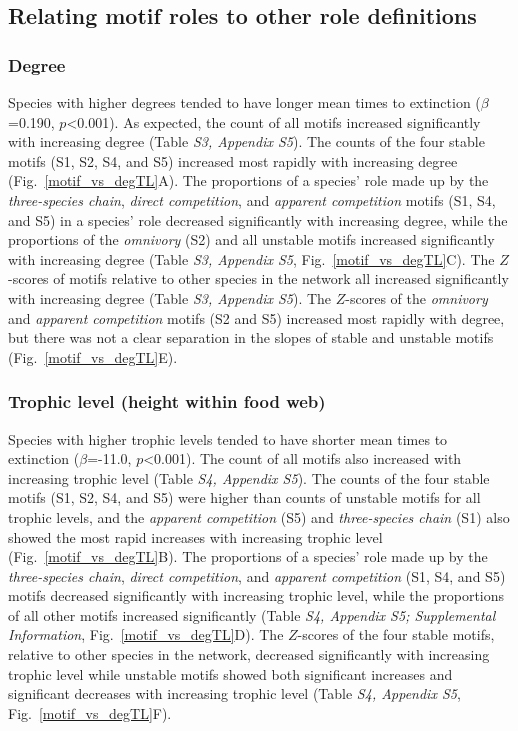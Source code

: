 \documentclass[12pt]{article}
\begin{document}
\begin{spacing}{2.0}
	\subsection*{Relating motif roles to other role definitions}

        \subsubsection*{Degree}
        
            Species with higher degrees tended to have longer mean times to extinction ($\beta$=0.190, $p$\textless0.001).
    		As expected, the count of all motifs increased significantly with increasing degree (Table \emph{S3, Appendix S5}).
    		The counts of the four stable motifs (S1, S2, S4, and S5) increased most rapidly with increasing degree (Fig.~\ref{motif_vs_degTL}A).
    		The proportions of a species' role made up by the \emph{three-species chain}, \emph{direct competition}, and \emph{apparent competition} motifs (S1, S4, and S5) in a species' role decreased significantly with increasing degree, while the proportions of the \emph{omnivory} (S2) and all unstable motifs increased significantly with increasing degree (Table \emph{S3, Appendix S5}, Fig.~\ref{motif_vs_degTL}C).
    		The $Z$-scores of motifs relative to other species in the network all increased significantly with increasing degree (Table \emph{S3, Appendix S5}).
            The $Z$-scores of the \emph{omnivory} and \emph{apparent competition} motifs (S2 and S5) increased most rapidly with degree, but there was not a clear separation in the slopes of stable and unstable motifs (Fig.~\ref{motif_vs_degTL}E).


        \subsubsection*{Trophic level (height within food web)}
            
            Species with higher trophic levels tended to have shorter mean times to extinction ($\beta$=-11.0, $p$\textless0.001).
            The count of all motifs also increased with increasing trophic level (Table \emph{S4, Appendix S5}). 
            The counts of the four stable motifs (S1, S2, S4, and S5) were higher than counts of unstable motifs for all trophic levels, and the \emph{apparent competition} (S5) and \emph{three-species chain} (S1) also showed the most rapid increases with increasing trophic level (Fig.~\ref{motif_vs_degTL}B).
            The proportions of a species' role made up by the \emph{three-species chain}, \emph{direct competition}, and \emph{apparent competition} (S1, S4, and S5) motifs decreased significantly with increasing trophic level, while the proportions of all other motifs increased significantly (Table \emph{S4, Appendix S5; Supplemental Information}, Fig.~\ref{motif_vs_degTL}D).
            The $Z$-scores of the four stable motifs, relative to other species in the network, decreased significantly with increasing trophic level while unstable motifs showed both significant increases and significant decreases with increasing trophic level (Table \emph{S4, Appendix S5}, Fig.~\ref{motif_vs_degTL}F).



\end{spacing}
\end{document}
